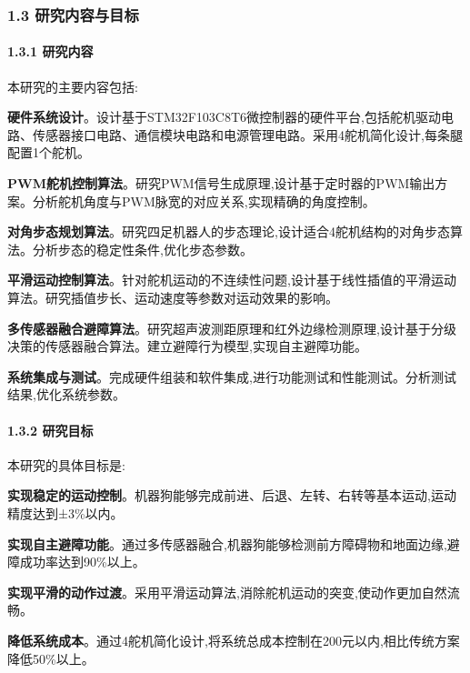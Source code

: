 \documentclass[
]{article}
\begin{document}
\hypertarget{ux7814ux7a76ux5185ux5bb9ux4e0eux76eeux6807}{%
\subsubsection{1.3
研究内容与目标}\label{ux7814ux7a76ux5185ux5bb9ux4e0eux76eeux6807}}

\hypertarget{ux7814ux7a76ux5185ux5bb9}{%
\paragraph{1.3.1 研究内容}\label{ux7814ux7a76ux5185ux5bb9}}

本研究的主要内容包括:

\textbf{硬件系统设计}。设计基于STM32F103C8T6微控制器的硬件平台,包括舵机驱动电路、传感器接口电路、通信模块电路和电源管理电路。采用4舵机简化设计,每条腿配置1个舵机。

\textbf{PWM舵机控制算法}。研究PWM信号生成原理,设计基于定时器的PWM输出方案。分析舵机角度与PWM脉宽的对应关系,实现精确的角度控制。

\textbf{对角步态规划算法}。研究四足机器人的步态理论,设计适合4舵机结构的对角步态算法。分析步态的稳定性条件,优化步态参数。

\textbf{平滑运动控制算法}。针对舵机运动的不连续性问题,设计基于线性插值的平滑运动算法。研究插值步长、运动速度等参数对运动效果的影响。

\textbf{多传感器融合避障算法}。研究超声波测距原理和红外边缘检测原理,设计基于分级决策的传感器融合算法。建立避障行为模型,实现自主避障功能。

\textbf{系统集成与测试}。完成硬件组装和软件集成,进行功能测试和性能测试。分析测试结果,优化系统参数。

\hypertarget{ux7814ux7a76ux76eeux6807}{%
\paragraph{1.3.2 研究目标}\label{ux7814ux7a76ux76eeux6807}}

本研究的具体目标是:

\textbf{实现稳定的运动控制}。机器狗能够完成前进、后退、左转、右转等基本运动,运动精度达到±3\%以内。

\textbf{实现自主避障功能}。通过多传感器融合,机器狗能够检测前方障碍物和地面边缘,避障成功率达到90\%以上。

\textbf{实现平滑的动作过渡}。采用平滑运动算法,消除舵机运动的突变,使动作更加自然流畅。

\textbf{降低系统成本}。通过4舵机简化设计,将系统总成本控制在200元以内,相比传统方案降低50\%以上。
\end{document}
